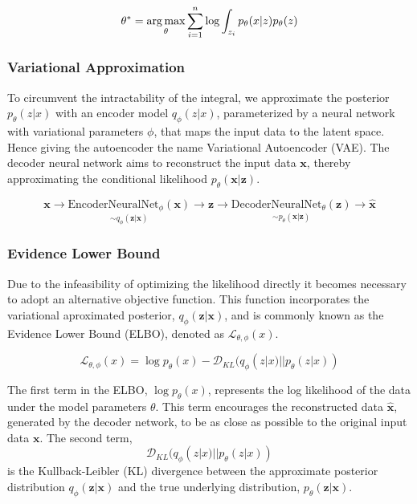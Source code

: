\begin{equation}
    \theta^* = \operatorname*{arg\,max}_\theta \sum_{i=1}^n \log\int_{z_i}p_\theta(x|z)p_\theta(z)
\end{equation}

\subsubsection{Variational Approximation}
To circumvent the intractability of the integral, we approximate the posterior \( p_\theta(z|x) \) with an encoder model \( q_\phi(z|x) \), parameterized by a neural network with variational parameters $\phi$, that maps the input data to the latent space.
Hence giving the autoencoder the name Variational Autoencoder (VAE). The decoder neural network aims to reconstruct the input data $\mathbf{x}$, thereby approximating the conditional likelihood $p_\theta(\mathbf{x}|\mathbf{z})$.

\begin{equation}
    \mathbf{x}\rightarrow \underset{\sim q_\phi(\mathbf{z}|\mathbf{x})}{\text{EncoderNeuralNet}_\phi(\mathbf{x})} \rightarrow \mathbf{z} \rightarrow \underset{\sim p_\theta(\mathbf{x}|\mathbf{z})}{\text{DecoderNeuralNet}_\theta(\mathbf{z})} \rightarrow \hat{\mathbf{x}}
\end{equation}

\subsubsection{Evidence Lower Bound}
Due to the infeasibility of optimizing the likelihood directly it becomes necessary to adopt an alternative objective function. This function incorporates the variational aproximated posterior, $q_\phi(\mathbf{z}|\mathbf{x})$, and is commonly known as the Evidence Lower Bound (ELBO), denoted as $\mathcal{L}_{\theta, \phi}(x)$.

\begin{equation}
    \mathcal{L}_{\theta, \phi}(x) = \log p_\theta(x) - \mathcal{D}_{KL}(q_\phi(z|x) || p_\theta(z|x))
    \label{eq:ELBO}
\end{equation}

The first term in the ELBO, $\log p_\theta(x)$, represents the log likelihood of the data under the model parameters $\theta$. This term encourages the reconstructed data $\hat{\mathbf{x}}$, generated by the decoder network, to be as close as possible to the original input data $\mathbf{x}$.
The second term, 
\begin{equation}
\mathcal{D}_{KL}(q_\phi(z|x) || p_\theta(z|x))
\end{equation}
is the Kullback-Leibler (KL) divergence between the approximate posterior distribution $q_\phi(\mathbf{z}|\mathbf{x})$ and the true underlying distribution, $p_\theta(\mathbf{z}|\mathbf{x})$.

